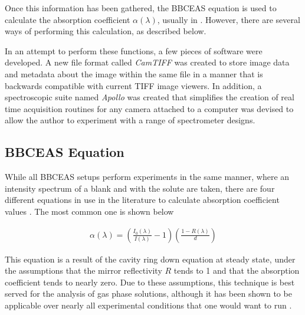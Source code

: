 Once this information has been gathered, the \ac{BBCEAS} equation is used
to calculate the absorption coefficient $\alpha(\lambda)$, usually in \icm.
However, there are several ways of performing this calculation, as described
below.


In an attempt to perform these functions, a few pieces of software were
developed. A new file format called \emph{CamTIFF} was created to store
image data and metadata about the image within the same file in a manner
that is backwards compatible with current TIFF image viewers. In addition,
a spectroscopic suite named \emph{Apollo} was created that simplifies the
creation of real time acquisition routines for any camera attached to a
computer was devised to allow the author to experiment with a range of
spectrometer designs.



\subsection{BBCEAS Equation}\label{subsec:bbceas_eq}


While all \ac{BBCEAS} setups perform experiments in the same manner, where an
intensity spectrum of a blank and with the solute are taken, there are four
different equations in use in the literature to calculate absorption
coefficient values \cite{Mazurenka:2005fh}. The most common one is shown below

  \begin{align}
    \alpha(\lambda) = \left(\frac{I_0(\lambda)}{I(\lambda)}-1\right)\left(\frac{1-R(\lambda)}{d}\right)\label{eq:ceas_std}
  \end{align}


This equation is a result of the cavity ring down equation at steady state,
under the assumptions that the mirror reflectivity $R$ tends to 1 and that the
absorption coefficient tends to nearly zero. Due to these assumptions, this
technique is best served for the analysis of gas phase solutions, although it
has been shown to be applicable over nearly all experimental conditions that
one would want to run \cite{Mazurenka:2005fh}.

